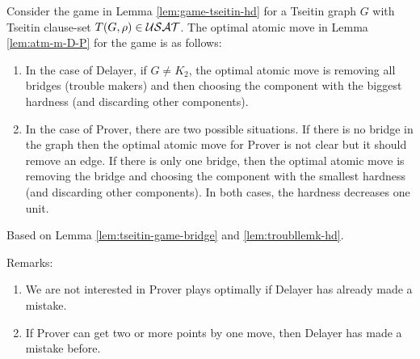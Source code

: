 \documentclass{report}
\begin{document}
\begin{lem}\label{lem:atmvtseitin}
Consider the game in Lemma \ref{lem:game-tseitin-hd} for a Tseitin graph $G$ with Tseitin clause-set $T(G,\rho) \in \mathcal{USAT}$. The optimal atomic move in Lemma \ref{lem:atm-m-D-P} for the game is as follows:
  \begin{enumerate}
  \item In the case of Delayer, if $G \not = K_2$, the optimal atomic move is removing all bridges (trouble makers) and then choosing the component with the biggest hardness (and discarding other components). 
  \item In the case of Prover, there are two possible situations. If there is no bridge in the graph then the optimal atomic move for Prover is not clear but it should remove an edge. If there is only one bridge, then the optimal atomic move is removing the bridge and choosing the component with the smallest hardness (and discarding other components). In both cases, the hardness decreases one unit.
  \end{enumerate}
\end{lem}
\begin{prf}
Based on Lemma \ref{lem:tseitin-game-bridge} and \ref{lem:troubllemk-hd}.
\end{prf}
Remarks:
  \begin{enumerate}
  \item We are not interested in Prover plays optimally if Delayer has already made a mistake.
  \item If Prover can get two or more points by one move, then Delayer has made a mistake before.
  \end{enumerate}

\end{document}

